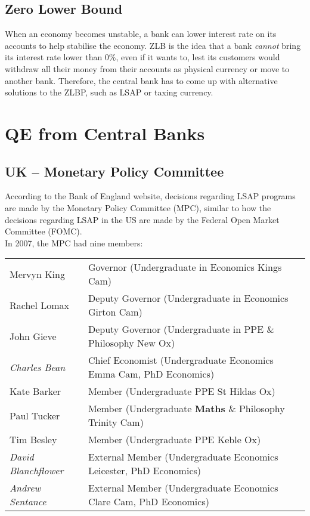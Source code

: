 \documentclass[notitlepage,12pt]{report}
\begin{document}
\section{Zero Lower Bound}

When an economy becomes unstable, a bank can lower interest rate on its accounts to help stabilise the economy. ZLB is the idea that a bank {\it cannot} bring its interest rate lower than 0\%, even if it wants to, lest its customers would withdraw all their money from their accounts as physical currency or move to another bank. Therefore, the central bank has to come up with alternative solutions to the ZLBP, such as LSAP or taxing currency.

\chapter{QE from Central Banks}

\section{UK -- Monetary Policy Committee}

According to the Bank of England website, decisions regarding LSAP programs are made by the Monetary Policy Committee\cite{noauthor_quantitative_nodate} (MPC), similar to how the decisions regarding LSAP in the US are made by the Federal Open Market Committee (FOMC).\cite[p.1]{gagnon_large-scale_2011}\\

In 2007, the MPC had nine members\cite{noauthor_bank_2007}:\\


\begin{tabular}{@{$\bullet$ }lp{}l}
	Mervyn King & Governor (Undergraduate in Economics Kings Cam)\\
	Rachel Lomax & Deputy Governor (Undergraduate in Economics Girton Cam)\\
	John Gieve & Deputy Governor (Undergraduate in PPE \& Philosophy New Ox)\\
	{\it Charles Bean} & Chief Economist (Undergraduate Economics Emma Cam, PhD Economics)\\
	Kate Barker & Member (Undergraduate PPE St Hildas Ox)\\
	Paul Tucker & Member (Undergraduate {\bf Maths} \& Philosophy Trinity Cam)\\
	Tim Besley & Member (Undergraduate PPE Keble Ox)\\
	{\it David Blanchflower} & External Member (Undergraduate Economics Leicester, PhD Economics)\\
	{\it Andrew Sentance} & External Member (Undergraduate Economics Clare Cam, PhD Economics)
\end{tabular}
\end{document}
